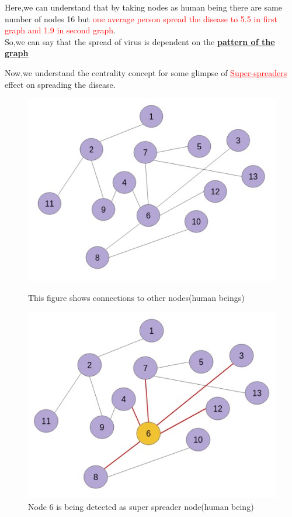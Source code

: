 \documentclass[12pt]{article}
\begin{document}
\par Here,we can understand that by taking nodes as human being there are same number of nodes 16 but \textcolor{red}{one average person spread the disease to 5.5 in first graph and 1.9 in second graph}.
\\
So,we can say that the spread of virus is dependent on the {\underline\bf {pattern of the graph}}
\\
[1 cm]
\par Now,we understand the centrality concept for some glimpse of  \textcolor{red}{\underline{Super-spreaders}} effect on spreading the disease.\\

\begin{figure}[H]
\includegraphics[width=10 cm,height=10 cm]{Cetrality.jpeg}
\caption{This figure shows connections to other nodes(human beings)\cite{nj5}
}
\includegraphics[width=10 cm,height=10 cm]{Cetrality_2.jpeg}
\caption{Node 6 is being detected as super spreader node(human being)\cite{nj5}}
\end{figure}
\end{document}
